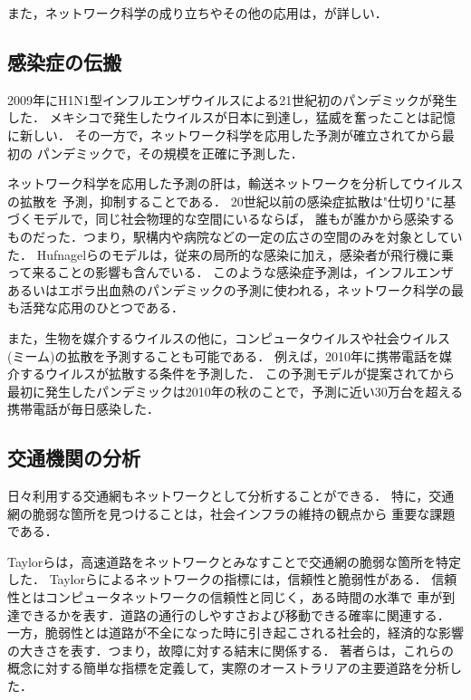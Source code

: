 また，ネットワーク科学の成り立ちやその他の応用は，\cite{Barabasi2016}が詳しい．

\subsection{感染症の伝搬}

2009年にH1N1型インフルエンザウイルスによる21世紀初のパンデミックが発生した．
メキシコで発生したウイルスが日本に到達し，猛威を奮ったことは記憶に新しい．
その一方で，ネットワーク科学を応用した予測\cite{Hufnagel2004}が確立されてから最初の
パンデミックで，その規模を正確に予測した\cite{Balcan2009}．

ネットワーク科学を応用した予測の肝は，輸送ネットワークを分析してウイルスの拡散を
予測，抑制することである．
20世紀以前の感染症拡散は"仕切り"に基づくモデルで，同じ社会物理的な空間にいるならば，
誰もが誰かから感染するものだった．つまり，駅構内や病院などの一定の広さの空間のみを対象としていた．
Hufnagelらのモデルは，従来の局所的な感染に加え，感染者が飛行機に乗って来ることの影響も含んでいる．
このような感染症予測は，インフルエンザあるいはエボラ出血熱のパンデミックの予測に使われる，ネットワーク科学の最も活発な応用のひとつである．

また，生物を媒介するウイルスの他に，コンピュータウイルスや社会ウイルス(ミーム)の拡散を予測することも可能である．
例えば，2010年に携帯電話を媒介するウイルスが拡散する条件を予測した\cite{Wang2009}．
この予測モデルが提案されてから最初に発生したパンデミックは2010年の秋のことで，予測に近い30万台を超える携帯電話が毎日感染した．

\subsection{交通機関の分析}

日々利用する交通網もネットワークとして分析することができる．
特に，交通網の脆弱な箇所を見つけることは，社会インフラの維持の観点から
重要な課題である．

Taylorらは，高速道路をネットワークとみなすことで交通網の脆弱な箇所を特定した\cite{Taylor2007}．
Taylorらによるネットワークの指標には，信頼性と脆弱性がある．
信頼性とはコンピュータネットワークの信頼性と同じく，ある時間の水準で
車が到達できるかを表す．道路の通行のしやすさおよび移動できる確率に関連する．
一方，脆弱性とは道路が不全になった時に引き起こされる社会的，経済的な影響の大きさを表す．つまり，故障に対する結末に関係する．
著者らは，これらの概念に対する簡単な指標を定義して，実際のオーストラリアの主要道路を分析した．

